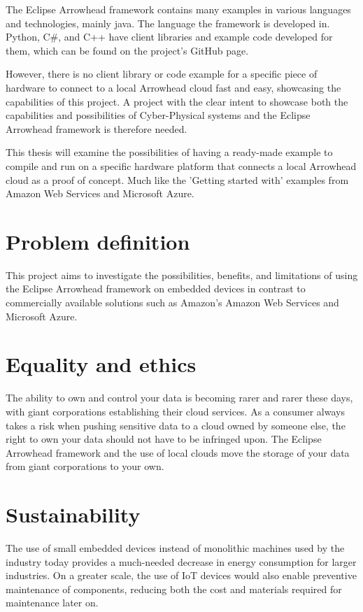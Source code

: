 The Eclipse Arrowhead framework contains many examples in various languages and technologies, mainly java. The language the framework is developed in. 
Python, C\#, and C++ have client libraries and example code developed for them, which can be found on the project's GitHub page.\cite{AC2021} 

However, there is no client library or code example for a specific piece of hardware to connect to a local Arrowhead cloud fast and easy, showcasing the capabilities of this project. 
A project with the clear intent to showcase both the capabilities and possibilities of Cyber-Physical systems and the Eclipse Arrowhead framework is therefore needed.

This thesis will examine the possibilities of having a ready-made example to compile and run on a specific hardware platform that connects a local Arrowhead cloud as a proof of concept. 
Much like the 'Getting started with' examples from Amazon Web Services and Microsoft Azure.\cite{Guide2020,AZURE2021}
\section{Problem definition}
This project aims to investigate the possibilities, benefits, and limitations of using the Eclipse Arrowhead framework on embedded devices in contrast to commercially available solutions such
as Amazon's Amazon Web Services and Microsoft Azure. 
\section{Equality and ethics}
The ability to own and control your data is becoming rarer and rarer these days, with giant corporations establishing their cloud services.
As a consumer always takes a risk when pushing sensitive data to a cloud owned by someone else, the right to own your data should not have to be infringed upon. 
The Eclipse Arrowhead framework and the use of local clouds move the storage of your data from giant corporations to your own.
\section{Sustainability}
The use of small embedded devices instead of monolithic machines used by the industry today provides a much-needed decrease in energy consumption for larger industries.
On a greater scale, the use of IoT devices would also enable preventive maintenance of components, reducing both the cost and materials required for maintenance later on.

